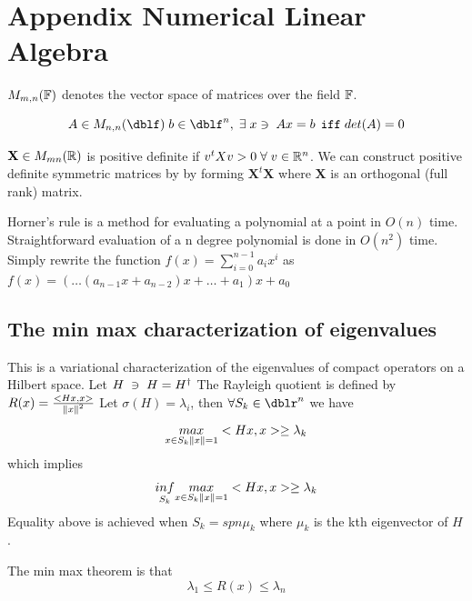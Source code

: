 \def\baselinestretch{1}

\chapter{Appendix Numerical Linear Algebra}
$M_{m,n}(\mathbb{F})$ denotes the vector space of matrices over
the field $\mathbb{F}$.

\[A \in M_{n,n}(\dblf) \; b \in \dblf^n,  \exts x  \ni \; Ax=b \,
\;\texttt{iff}\; det(A)=0\]

$\mathbf{X} \in M_{mn}(\mathbb{R})$ is positive definite if $
v^{t} X v > 0 \; \forall \; v \in \mathbb{R}^n$.  We can construct
positive definite symmetric matrices by by forming
$\mathbf{X}^{t} \mathbf{X}$ where $\mathbf{X}$ is an orthogonal
(full rank) matrix.

Horner's rule is a method for evaluating a polynomial at a
point in $O(n)$ time. Straightforward evaluation of a n degree
polynomial is done in $O(n^{2})$ time. Simply rewrite the
function $f(x)= \sum\limits_{i=0}^{n-1} {a}_i x^{i}$ as
$f(x)=(\ldots (a_{n-1}x + a_{n-2} )x +  \ldots + a_1)x+a_0$

\section*{The min max characterization of eigenvalues}
This is a variational characterization of the eigenvalues of compact operators on a Hilbert space. Let $H \; \ni \; H=H^\dag$ The Rayleigh quotient is defined by $R(x) =  \frac{<Hx,x>}{\left\Vert x\right\Vert^2}$ Let $\sigma(H) ={\lambda_i}$, then $\forall S_k \in \dblr^n$ we have
\begin{equation*}
  \underset{x \in S_k \left\Vert x\right\Vert=1}{max} <Hx,x> \geq \lambda_k
\end{equation*}
which implies
\begin{equation*}
\underset{S_k}{inf}  \underset{x \in S_k \left\Vert x\right\Vert=1}{max} <Hx,x> \geq \lambda_k
\end{equation*}
Equality above is achieved when $S_k = spn{\mu_k}$ where $\mu_k$ is the kth eigenvector of $H$.

The min max theorem is that
\begin{equation*}
\lambda_1 \leq R(x) \leq \lambda_n
\end{equation*}




